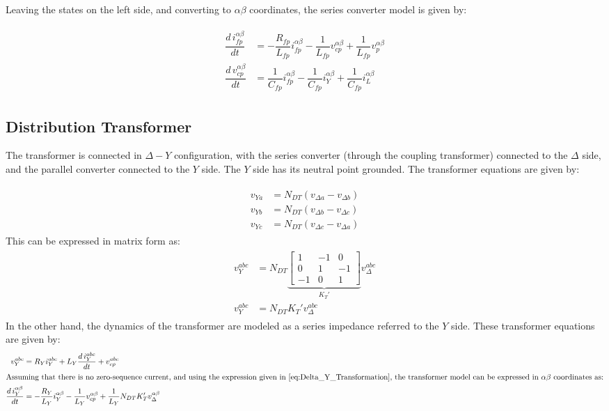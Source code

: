 Leaving the states on the left side, and converting to $\alpha\beta$ coordinates, the series converter model is given by:

\begin{align}
    \begin{aligned}
        \dfrac{d\,i_{fp}^{\alpha\beta}}{dt} &= -\dfrac{R_{fp}}{L_{fp}}i_{fp}^{\alpha\beta} - \dfrac{1}{L_{fp}}v_{cp}^{\alpha\beta} + \dfrac{1}{L_{fp}}v_p^{\alpha\beta} \\
        \dfrac{d\,v_{cp}^{\alpha\beta}}{dt} &= \dfrac{1}{C_{fp}}i_{fp}^{\alpha\beta} - \dfrac{1}{C_{fp}}i_Y^{\alpha\beta} + \dfrac{1}{C_{fp}}i_L^{\alpha\beta}
    \end{aligned}
\end{align}

\subsection{Distribution Transformer}

The transformer is connected in $\Delta-Y$ configuration, with the series converter (through the coupling transformer) connected to the $\Delta$ side, and the parallel converter connected to the $Y$ side. The $Y$ side has its neutral point grounded. The transformer equations are given by:

\begin{align}
    \begin{aligned}
        v_{Ya} &= N_{DT}(v_{\Delta a} - v_{\Delta b}) \\
        v_{Yb} &= N_{DT}(v_{\Delta b} - v_{\Delta c}) \\
        v_{Yc} &= N_{DT}(v_{\Delta c} - v_{\Delta a})
    \end{aligned}
\end{align}
This can be expressed in matrix form as:
\begin{align}
    \begin{aligned}
        v_Y^{abc} &= N_{DT}
        \underbrace{
        \begin{bmatrix}
            1 & -1 & 0 \\
            0 & 1 & -1 \\
            -1 & 0 & 1
        \end{bmatrix}
        }_{K_T'}
        v_{\Delta}^{abc}\\
        v_Y^{abc} &= N_{DT} K_T' v_{\Delta}^{abc} \label{eq:Delta_Y_Transformation}
    \end{aligned}
\end{align}
In the other hand, the dynamics of the transformer are modeled as a series impedance referred to the $Y$ side. These transformer equations are given by:
\begin{align}
    v_{Y}^{abc} &= R_Yi_Y^{abc} + L_Y\dfrac{d\,i_Y^{abc}}{dt} + v_{cp}^{abc} \\
    \intertext{Assuming that there is no zero-sequence current, and using the expression given in \eqref{eq:Delta_Y_Transformation}, the transformer model can be expressed in $\alpha\beta$ coordinates as:}
    \dfrac{d\,i_Y^{\alpha\beta}}{dt} &= -\dfrac{R_Y}{L_Y}i_Y^{\alpha\beta} - \dfrac{1}{L_Y}v_{cp}^{\alpha\beta} + \dfrac{1}{L_Y}N_{DT}K_T'v_{\Delta}^{\alpha\beta}
\end{align}


